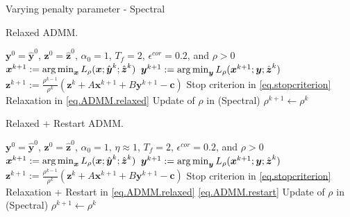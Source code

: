 \documentclass[8pt,red]{beamer}
\theoremstyle{plain}
\theoremstyle{definition}
\theoremstyle{remark}
\newcommand{\refalg}[1]{Algorithm~\ref{#1}}
\newcommand{\argmin}{\operatornamewithlimits{\mathrm{arg\,min}}}
\newcommand{\bi}[1]{\ensuremath{\boldsymbol{#1}}}
\begin{document}
\begin{frame}{Varying penalty parameter - Spectral}
\begin{algorithm}[H]
  \scriptsize
  \caption{Relaxed ADMM.}
  \label{alg:prototype.vp-R-Spectral}
  \begin{algorithmic}[1]
    \Require
    $\bi{y}^{0} = \hat{\bi{y}}^{0}$, $\bi{z}^{0}=\hat{\bi{z}}^{0}$, $\alpha_{0}=1$, $T_{f} = 2$, $\epsilon^{cor} = 0.2$, and $\rho > 0$ 
    \State
    $\bi{x}^{k+1} 
    := \argmin_{\bi{x}} L_{\rho}(\bi{x};\hat{\bi{y}}^{k};\hat{\bi{z}}^{k})$ 
    \State
    $\bi{y}^{k+1} 
    := \argmin_{\bi{y}} L_{\rho}(\bi{x}^{k+1};\bi{y};\hat{\bi{z}}^{k})$ 
    \State
    $\bi{z}^{k+1} 
  := \frac{\rho^{k-1}}{\rho^{k}} \left( \bi{z}^{k} + A \bi{x}^{k+1} + B \bi{y}^{k+1} - \bi{c} \right)$ 
    \State
    Stop criterion in \eqref{eq.stopcriterion}
    \State
    Relaxation in \eqref{eq.ADMM.relaxed}
    \State
    Update of $\rho$ in (Spectral)
    \Else
    \State
    $\rho^{k+1} \leftarrow \rho^{k}$
    \EndIf
    \EndFor
  \end{algorithmic}
\end{algorithm}

\begin{algorithm}[H]
  \scriptsize
  \caption{Relaxed + Restart ADMM.}
  \label{alg:prototype.vp-RR-Spectral}
  \begin{algorithmic}[1]
    \Require
    $\bi{y}^{0} = \hat{\bi{y}}^{0}$, $\bi{z}^{0}=\hat{\bi{z}}^{0}$, 
    $\alpha_{0}=1$, $\eta \approx 1$, $T_{f} = 2$, $\epsilon^{cor} = 0.2$, and $\rho > 0$ 
    \State
    $\bi{x}^{k+1} 
    := \argmin_{\bi{x}} L_{\rho}(\bi{x};\hat{\bi{y}}^{k};\hat{\bi{z}}^{k})$ 
    \State
    $\bi{y}^{k+1} 
    := \argmin_{\bi{y}} L_{\rho}(\bi{x}^{k+1};\bi{y};\hat{\bi{z}}^{k})$ 
    \State
    $\bi{z}^{k+1} 
  := \frac{\rho^{k-1}}{\rho^{k}} \left( \bi{z}^{k} + A \bi{x}^{k+1} + B \bi{y}^{k+1} - \bi{c} \right)$ 
    \State
    Stop criterion in \eqref{eq.stopcriterion}
    \State
    Relaxation + Restart in \eqref{eq.ADMM.relaxed} \eqref{eq.ADMM.restart}
    \State
    Update of $\rho$ in (Spectral)
    \Else
    \State
    $\rho^{k+1} \leftarrow \rho^{k}$
    \EndIf
    \EndFor
  \end{algorithmic}
\end{algorithm}
\end{frame}
\end{document}
